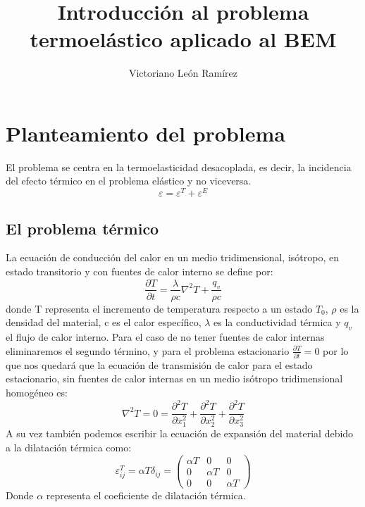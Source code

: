 \documentclass[11pt,a4paper]{article}
\author{Victoriano León Ramírez}
\title{Introducción al problema termoelástico aplicado al BEM}
\begin{document}
\maketitle
\section{Planteamiento del problema}
El problema se centra en la termoelasticidad desacoplada, es decir, la incidencia del efecto térmico en el problema elástico y no viceversa. \\
\begin{equation}
 \varepsilon =\varepsilon^{T} +\varepsilon^{E}
 \end{equation}
\subsection{El problema térmico}
La ecuación de conducción del calor en un medio tridimensional, isótropo, en estado transitorio y con fuentes de calor interno se define por:
\begin{equation}
\frac{\partial{T}}{\partial{t}}=\frac{\lambda}{\rho c} \nabla^{2} T + \frac{q_{v}}{\rho c}
\end{equation}
donde T representa el incremento de temperatura respecto a un estado $T_{0}$, $\rho$ es la densidad del material, c es el calor específico, $\lambda$ es la conductividad térmica y $q_{v}$ el flujo de calor interno.
Para el caso de no tener fuentes de calor internas eliminaremos el segundo término, y para el problema estacionario $\frac{\partial{T}}{\partial{t}}=0$ por lo que nos quedará que la ecuación de transmisión de calor para el estado estacionario, sin fuentes de calor internas en un medio isótropo tridimensional homogéneo es:
\begin{equation}
\nabla^{2}T=0= \frac{\partial^{2}T}{\partial{x_1^{2}}} +\frac{\partial^{2}T}{\partial{x_2^{2}}} +\frac{\partial^{2}T}{\partial{x_3^{2}}}
\end{equation}
A su vez también podemos escribir la ecuación de expansión del material debido a la dilatación térmica como:
\begin{equation}
\varepsilon^{T}_{ij}=\alpha T \delta_{ij}= \left( \begin{array}{ccc}
\alpha T & 0 & 0 \\
0 & \alpha T & 0\\
0 & 0 & \alpha T \end{array} \right)
\end{equation}
Donde $\alpha$ representa el coeficiente de dilatación térmica.
\end{document}
